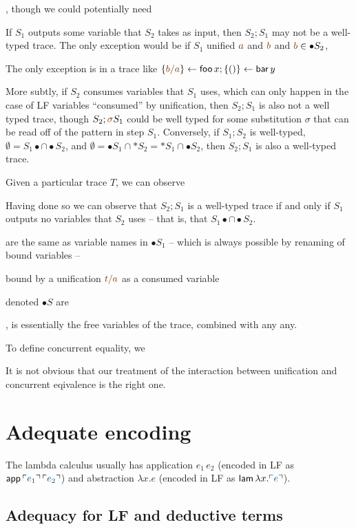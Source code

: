 , though we could
potentially need

If $S_1$
outputs some variable that $S_2$ takes as input, then $S_2; S_1$ may
not be a well-typed trace. The only exception would be if $S_1$
unified $\lf{a}$ and $\lf{b}$ and $\lf{b} \in {\bullet}S_2$, 

The only exception
is in a trace like $\trstep{\lf{b/a}}{\sf foo}\,x; \trstep{()}{\sf bar}\,y$


 More subtly, if
$S_2$ consumes variables that $S_1$ uses, which can only happen in the
case of LF variables ``consumed'' by unification, then $S_2; S_1$ is
also not a well typed trace, though $S_2; \lf{\sigma}S_1$ could be
well typed for some substitution $\sigma$ that can be read off of the
pattern in step $S_1$. Conversely, if $S_1; S_2$ is well-typed,
$\emptyset = S_1{\bullet} \cap {\bullet}S_2$, and $\emptyset =
{\bullet}S_1 \cap {\ast}S_2 = {\ast}S_1 \cap {\bullet}S_2$, then $S_2;
S_1$ is also a well-typed trace.

Given a particular trace $T$, we can observe 

Having done so we can observe that $S_2; S_1$ is a
well-typed trace if and only if $S_1$ outputs no variables
that $S_2$ uses -- that is, that $S_1{\bullet} \cap {\bullet}S_2$.

are the same as variable
names in ${\bullet}S_1$ -- which is always possible by renaming of
bound variables --

bound by
a unification $\lf{t/a}$ as a consumed variable


 denoted ${\bullet}S$
are 

, is 
essentially the free variables of the trace, combined with any any. 


To define concurrent equality, we 

It is not obvious that our treatment of the interaction between 
unification and concurrent eqivalence is the right one. 

\section{Adequate encoding}
\label{sec:sls-adequate}

The lambda
calculus usually has application $e_1\,e_2$ (encoded in LF as ${\sf
  app}\,\interp{e_1}\,\interp{e_2}$) and abstraction $\lambda x.e$
(encoded in LF as ${\sf lam}\,\lambda x. \interp{e}$). 

\subsection{Adequacy for LF and deductive terms}

